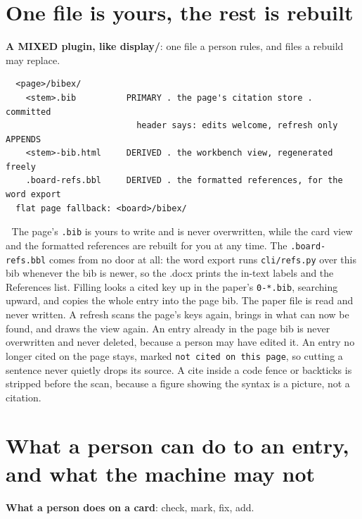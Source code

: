 
\section{One file is yours, the rest is rebuilt}
\textbf{A MIXED plugin, like display/}: one file a person rules, and files a rebuild may replace.

\begin{verbatim}
  <page>/bibex/
    <stem>.bib          PRIMARY . the page's citation store . committed
                          header says: edits welcome, refresh only APPENDS
    <stem>-bib.html     DERIVED . the workbench view, regenerated freely
    .board-refs.bbl     DERIVED . the formatted references, for the word export
  flat page fallback: <board>/bibex/
\end{verbatim}
📌 The page's \texttt{.bib} is yours to write and is never overwritten, while the card view and the formatted references are rebuilt for you at any time. The \texttt{.board-refs.bbl} comes from no door at all: the word export runs \texttt{cli/refs.py} over this bib whenever the bib is newer, so the .docx prints the in-text labels and the References list. Filling looks a cited key up in the paper's \texttt{0-*.bib}, searching upward, and copies the whole entry into the page bib. The paper file is read and never written. A refresh scans the page's keys again, brings in what can now be found, and draws the view again. An entry already in the page bib is never overwritten and never deleted, because a person may have edited it. An entry no longer cited on the page stays, marked \texttt{not cited on this page}, so cutting a sentence never quietly drops its source. A cite inside a code fence or backticks is stripped before the scan, because a figure showing the syntax is a picture, not a citation.


\section{What a person can do to an entry, and what the machine may not}
\textbf{What a person does on a card}: check, mark, fix, add.

